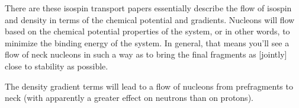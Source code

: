 There are these isospin transport papers essentially describe the flow of isospin and density in terms of the chemical potential and gradients. Nucleons will flow based on the chemical potential properties of the system, or in other words, to minimize the binding energy of the system. In general, that means you'll see a flow of neck nucleons in such a way as to bring the final fragments as [jointly] close to stability as possible.

The density gradient terms will lead to a flow of nucleons from prefragments to neck (with apparently a greater effect on neutrons than on protons).

